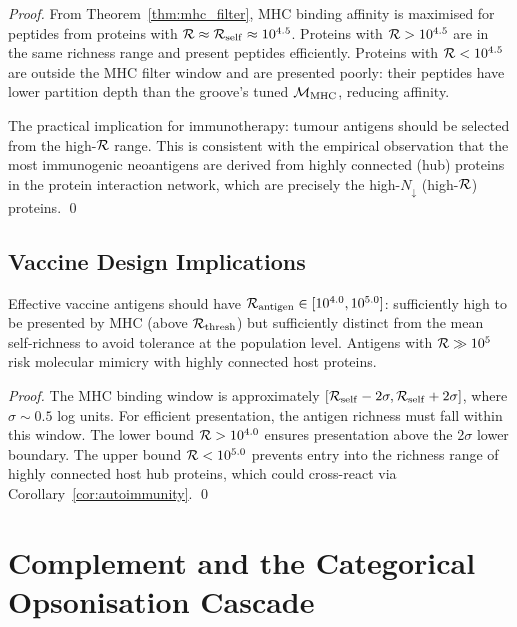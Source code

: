 \begin{proof}
From Theorem~\ref{thm:mhc_filter}, MHC binding affinity is maximised for
peptides from proteins with $\mathcal{R} \approx \mathcal{R}_{\mathrm{self}} \approx 10^{4.5}$.
Proteins with $\mathcal{R} > 10^{4.5}$ are in the same richness range and present
peptides efficiently. Proteins with $\mathcal{R} < 10^{4.5}$ are outside the
MHC filter window and are presented poorly: their peptides have lower partition
depth than the groove's tuned $\mathcal{M}_{\mathrm{MHC}}$, reducing affinity.

The practical implication for immunotherapy: tumour antigens should be
selected from the high-$\mathcal{R}$ range. This is consistent with the empirical
observation that the most immunogenic neoantigens are derived from highly
connected (hub) proteins in the protein interaction network, which are
precisely the high-$N_{\downarrow}$ (high-$\mathcal{R}$) proteins. \qed
\end{proof}

\subsection{Vaccine Design Implications}

\begin{corollary}
\label{cor:vaccine_design}
Effective vaccine antigens should have $\mathcal{R}_{\mathrm{antigen}} \in [10^{4.0}, 10^{5.0}]$:
sufficiently high to be presented by MHC (above $\mathcal{R}_{\mathrm{thresh}}$)
but sufficiently distinct from the mean self-richness to avoid tolerance
at the population level. Antigens with $\mathcal{R} \gg 10^5$ risk molecular mimicry
with highly connected host proteins.
\end{corollary}

\begin{proof}
The MHC binding window is approximately $[\mathcal{R}_{\mathrm{self}} - 2\sigma,
\mathcal{R}_{\mathrm{self}} + 2\sigma]$, where $\sigma \sim 0.5$ log units.
For efficient presentation, the antigen richness must fall within this window.
The lower bound $\mathcal{R} > 10^{4.0}$ ensures presentation above the 2$\sigma$
lower boundary. The upper bound $\mathcal{R} < 10^{5.0}$ prevents entry into the
richness range of highly connected host hub proteins, which could cross-react
via Corollary~\ref{cor:autoimmunity}. \qed
\end{proof}

\section{Complement and the Categorical Opsonisation Cascade}
\label{sec:complement}

